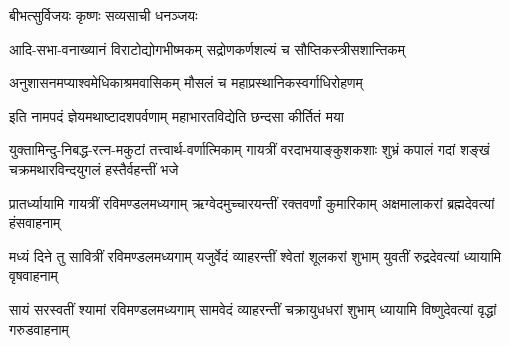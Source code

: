 \begin{center}

{बीभत्सुर्विजयः कृष्णः सव्यसाची धनञ्जयः}

\twolineshloka
{आदि-सभा-वनाख्यानं विराटोद्योगभीष्मकम्}
{सद्रोणकर्णशल्यं च सौप्तिकस्त्रीसशान्तिकम्}

\twolineshloka
{अनुशासनमप्याश्वमेधिकाश्रमवासिकम्}
{मौसलं च महाप्रस्थानिकस्वर्गाधिरोहणम्}

\twolineshloka
{इति नामपदं ज्ञेयमथाष्टादशपर्वणाम्}
{महाभारतविद्येति छन्दसा कीर्तितं मया}


{युक्तामिन्दु-निबद्ध-रत्न-मकुटां तत्त्वार्थ-वर्णात्मिकाम्}
{गायत्रीं वरदाभयाङ्कुशकशाः शुभ्रं कपालं गदां}
{शङ्खं चक्रमथारविन्दयुगलं हस्तैर्वहन्तीं भजे}

\threelineshloka
{प्रातर्ध्यायामि गायत्रीं रविमण्डलमध्यगाम्}
{ऋग्वेदमुच्चारयन्तीं रक्तवर्णां कुमारिकाम्}
{अक्षमालाकरां ब्रह्मदेवत्यां हंसवाहनाम्}

\threelineshloka
{मध्यं दिने तु सावित्रीं रविमण्डलमध्यगाम्}
{यजुर्वेदं व्याहरन्तीं श्वेतां शूलकरां शुभाम्}
{युवतीं रुद्रदेवत्यां ध्यायामि वृषवाहनाम्}

\threelineshloka
{सायं सरस्वतीं श्यामां रविमण्डलमध्यगाम्}
{सामवेदं व्याहरन्तीं चक्रायुधधरां शुभाम्}
{ध्यायामि विष्णुदेवत्यां वृद्धां गरुडवाहनाम्}








\end{center}
